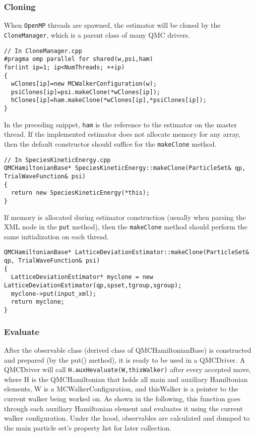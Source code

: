 \subsubsection{Cloning}
When \verb|OpenMP| threads are spawned, the estimator will be cloned by the \verb|CloneManager|, which is a parent class of many QMC drivers. 
\begin{lstlisting}[style=C++]
// In CloneManager.cpp
#pragma omp parallel for shared(w,psi,ham)
for(int ip=1; ip<NumThreads; ++ip)
{
  wClones[ip]=new MCWalkerConfiguration(w);
  psiClones[ip]=psi.makeClone(*wClones[ip]);
  hClones[ip]=ham.makeClone(*wClones[ip],*psiClones[ip]);
}
\end{lstlisting}
In the preceding snippet, \verb|ham| is the reference to the estimator on the master thread. If the implemented estimator does not allocate memory for any array, then the default constructor should suffice for the \verb|makeClone| method.
\begin{lstlisting}[style=C++]
// In SpeciesKineticEnergy.cpp
QMCHamiltonianBase* SpeciesKineticEnergy::makeClone(ParticleSet& qp, TrialWaveFunction& psi)
{
  return new SpeciesKineticEnergy(*this);
}
\end{lstlisting}
If memory is allocated during estimator construction (usually when parsing the XML node in the \verb|put| method), then the \verb|makeClone| method should perform the same initialization on each thread.
\begin{lstlisting}[style=C++]
QMCHamiltonianBase* LatticeDeviationEstimator::makeClone(ParticleSet& qp, TrialWaveFunction& psi)
{
  LatticeDeviationEstimator* myclone = new LatticeDeviationEstimator(qp,spset,tgroup,sgroup);
  myclone->put(input_xml);
  return myclone;
}
\end{lstlisting}

\subsubsection{Evaluate}
After the observable class (derived class of QMCHamiltonianBase) is constructed and prepared (by the put() method), it is ready to be used in a QMCDriver. A QMCDriver will call \verb|H.auxHevaluate(W,thisWalker)| after every accepted move, where H is the QMCHamiltonian that holds all main and auxiliary Hamiltonian elements, W is a MCWalkerConfiguration, and thisWalker is a pointer to the current walker being worked on. As shown in the following, this function goes through each auxiliary Hamiltonian element and evaluates it using the current walker configuration. Under the hood, observables are calculated and dumped to the main particle set's property list for later collection.


